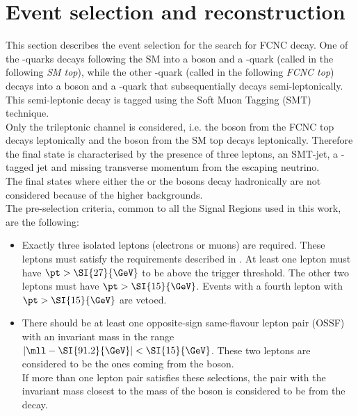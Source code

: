 \section{Event selection and reconstruction}
\label{sec:selection}
This section describes the event selection for the search for FCNC \tZc decay.
One of the \Pqt-quarks decays following the SM into a \PW boson and a
\Pqb-quark (called in the following \textit{SM top}), while the other
\Pqt-quark (called in the following \textit{FCNC top}) decays into a \PZ
boson and a \Pqc-quark that subsequentially decays semi-leptonically.
This semi-leptonic decay is tagged using the Soft Muon Tagging (SMT) technique. \\
Only the trileptonic channel is considered, i.e. the \PZ boson from the
FCNC top decays leptonically and the \PW boson from the SM top
decays leptonically.
Therefore the final state is characterised by the presence of three leptons, an
SMT-jet, a \Pqb-tagged jet and missing transverse momentum from the
escaping neutrino. \\
The final states where either the \PZ or the \PW bosons decay
hadronically are not considered because of the higher backgrounds.\\
The pre-selection criteria, common to all the Signal Regions used in this work, are the following:
\begin{itemize}
	\item    Exactly three isolated leptons (electrons or muons) are required. 
				These leptons must satisfy the requirements described in
				. 
				At least one lepton must have $\pt > \SI{27}{\GeV}$ to be above the trigger threshold.
				The other two leptons must have $\pt > \SI{15}{\GeV}$. 
				Events with a fourth lepton with $\pt > \SI{15}{\GeV}$ are vetoed. 
	\item   There should be at least one opposite-sign same-flavour lepton pair
				(OSSF) with an invariant mass in the range 
				$|\mll - \SI{91.2}{\GeV}| < \SI{15}{\GeV}$. 
				These two leptons are considered to be the ones coming from the \PZ boson.\\ 	
				If more than one lepton pair satisfies these selections, the pair
				with the invariant mass closest to the mass of the \PZ boson is
				considered to be from the \PZ decay. 
\end{itemize}	


